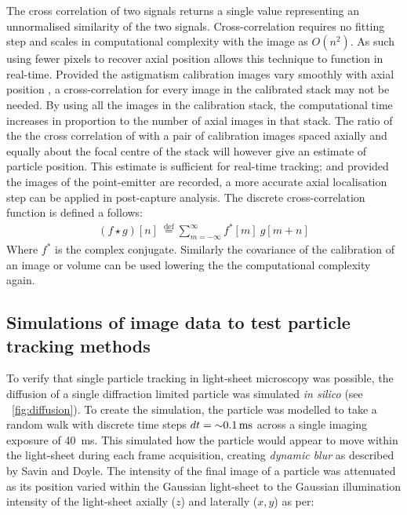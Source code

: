 The cross correlation of two signals returns a single value representing an unnormalised similarity of the two signals.
Cross-correlation requires no fitting step and scales in computational complexity with the image as \(O(n^2)\).
As such using fewer pixels %
to recover axial position allows this technique to function in real-time.
Provided the astigmatism
calibration images vary smoothly with axial position
, a cross-correlation for every image in the calibrated stack may not be needed.
By using all the images in the calibration stack, the computational time increases in proportion to the number of axial images in that stack.
The ratio of the the cross correlation of with a pair of calibration images spaced axially and equally about the focal centre of the stack will however give an estimate of particle position.
This estimate is sufficient for real-time tracking; and provided the images of the point-emitter are recorded, a more accurate axial localisation step can be applied in post-capture analysis.
The discrete cross-correlation function is defined a follows:
\begin{align}
(f \star g)[n]\ \stackrel{\mathrm{def}}{=} \sum_{m=-\infty}^{\infty} f^*[m]\ g[m+n]
\end{align}
Where \(f^*\) is the complex conjugate.
Similarly the covariance of the calibration of an image or volume can be used lowering the the computational complexity again.

\subsection{Simulations of image data to test particle tracking methods}
To verify that single particle tracking in light-sheet microscopy was possible, the diffusion of a single diffraction limited particle was simulated \emph{in silico} (see \figurename~\ref{fig:diffusion}).
To create the simulation, the particle was modelled to take a random walk with discrete time steps \(dt=\SI{\sim0.1}{\milli\second}\) across a single imaging exposure of \SI{40}{\milli\second}.
This simulated how the particle would appear to move within the light-sheet during each frame acquisition, creating \emph{dynamic blur} as described by Savin and Doyle\cite{savinStaticDynamicErrors2005}.
The intensity of the final image of a particle was attenuated as its position varied within the Gaussian light-sheet to the Gaussian illumination intensity of the light-sheet axially (\(z\)) and laterally (\(x,y\)) as per:

